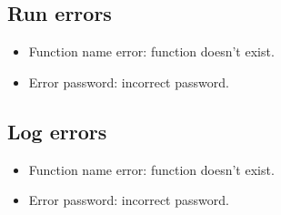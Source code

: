 \subsection{Run errors}
\begin{itemize}
	\item Function name error: function doesn't exist.
	\item Error password: incorrect password.
\end{itemize}
\subsection{Log errors}
\begin{itemize}
	\item Function name error: function doesn't exist.
	\item Error password: incorrect password.
\end{itemize}